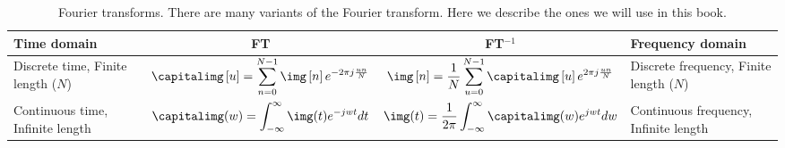 \begin{table}[h]
	\caption{Fourier transforms. There are many variants of the Fourier transform. Here we describe the ones we will use in this book.} %
	\begin{center}
		{
			\renewcommand{\arraystretch}{2.5}
			\begin{tabular}{| p{2.1cm} | c | c | p{2.1cm} |}
				\hline
				Time domain                                                                                                               & FT & FT$^{-1}$ & Frequency domain \\
				\hline \hline
				Discrete time, Finite length ($N$)                                                                                        &
				$\displaystyle \capitalimg \left[u \right] = \sum_{n=0}^{N-1} \img \left[n \right] e^{-2 \pi j \frac{un}{N}}$
				                                                                                                                          &
				$\displaystyle \img \left[n \right] = \frac{1}{N} \sum_{u=0}^{N-1} \capitalimg \left[u \right] e^{2 \pi j \frac{un}{N} }$ &
				Discrete frequency, Finite length ($N$)                                                                                                                       \\
				\hline

				Continuous time, Infinite length                                                                                          &
				$\displaystyle \capitalimg (w) = \int_{- \infty}^{\infty} \img (t) e^{- j w t} dt$
				                                                                                                                          &
				$\displaystyle \img (t) = \frac{1}{2\pi} \int_{- \infty}^{\infty} \capitalimg (w) e^{j w t} d w$                          &
				Continuous frequency, Infinite length                                                                                                                         \\
				\hline


\end{tabular}}
\end{center}
\end{table}
